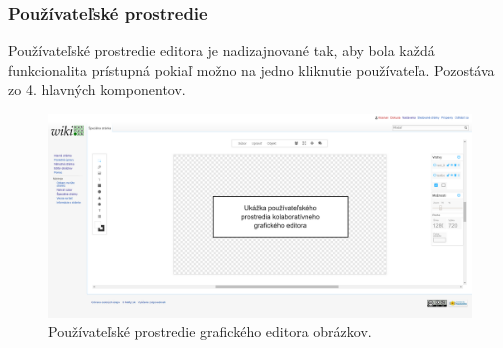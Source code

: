\subsubsection{Používateľské prostredie}
Používateľské prostredie editora je nadizajnované tak, aby bola každá funkcionalita prístupná pokiaľ možno na jedno kliknutie používateľa. Pozostáva zo 4. hlavných komponentov.

\begin{figure}[H]	
	\centerline{\includegraphics[width=1\textwidth]{images/results/base-editor}}
	\caption{Používateľské prostredie grafického editora obrázkov.}
	\label{obr:base-user-interface}
\end{figure}
	
